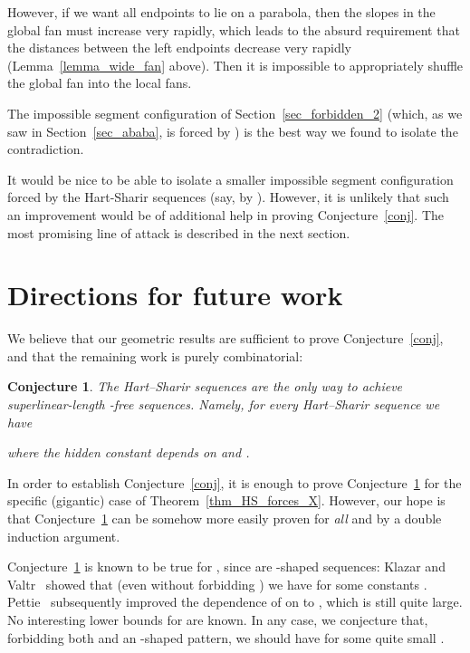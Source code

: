 \documentclass[11pt]{article}
\newtheorem{conjecture}[theorem]{Conjecture}
\theoremstyle{definition}
\theoremstyle{remark}
\begin{document}
However, if we want all endpoints to lie on a parabola, then the slopes in the global fan must increase very rapidly, which leads to the absurd requirement that the distances between the left endpoints decrease very rapidly (Lemma~\ref{lemma_wide_fan} above). Then it is impossible to appropriately shuffle the global fan into the local fans.

The impossible segment configuration  of Section~\ref{sec_forbidden_2} (which, as we saw in Section~\ref{sec_ababa}, is forced by ) is the best way we found to isolate the contradiction.

It would be nice to be able to isolate a smaller impossible segment configuration forced by the Hart-Sharir sequences (say, by ). However, it is unlikely that such an improvement would be of additional help in proving Conjecture~\ref{conj}. The most promising line of attack is described in the next section.

\section{Directions for future work}\label{sec_conj_only_DS}

We believe that our geometric results are sufficient to prove Conjecture~\ref{conj}, and that the remaining work is purely combinatorial:

\begin{conjecture}\label{conj_only_HS}
The Hart--Sharir sequences are the only way to achieve superlinear-length -free sequences. Namely, for every Hart--Sharir sequence  we have 

where the hidden constant depends on  and .
\end{conjecture}

In order to establish Conjecture~\ref{conj}, it is enough to prove Conjecture~\ref{conj_only_HS} for the specific (gigantic) case of Theorem~\ref{thm_HS_forces_X}. However, our hope is that Conjecture~\ref{conj_only_HS} can be somehow more easily proven for \emph{all}  and  by a double induction argument.

Conjecture~\ref{conj_only_HS} is known to be true for , since  are -shaped sequences: Klazar and Valtr~\cite{KV} showed that (even without forbidding ) we have  for some constants . Pettie~\cite{pettie_forbid} subsequently improved the dependence of  on  to , which is still quite large. No interesting lower bounds for  are known. In any case, we conjecture that, forbidding both  and an -shaped pattern, we should have  for some quite small .
\end{document}
